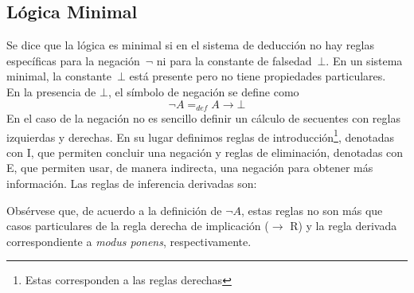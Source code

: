 \documentclass[11pt,letterpaper]{article}
\begin{document}


\subsection{Lógica Minimal}

Se dice que la lógica es minimal si en el sistema de deducci\'on no hay 
reglas específicas para la negación~$\neg$ ni para la constante de falsedad~$\bot$. 
En un sistema minimal, la constante~$\bot$ está presente pero no tiene 
propiedades particulares. \\

En la presencia de $\bot$, el símbolo de negación se define como 
$$ \neg A =_{def} A\to\bot $$
En el caso de la negación no es sencillo definir un cálculo de secuentes con
reglas izquierdas y derechas. En su lugar definimos reglas de
introducción\footnote{Estas corresponden a las reglas 
derechas}, denotadas con {\sc I}, que permiten concluir una negación y reglas 
de eliminación, denotadas con {\sc E}, que permiten usar, de
manera indirecta, una negación para obtener más información. 
Las reglas de inferencia derivadas son:

\begin{mathpar}

\end{mathpar}
Obsérvese que, de acuerdo a la definición de $\neg A$,  estas reglas
no son más que casos particulares de la regla derecha de implicación
\textsc{($\to$ R)} y la regla derivada correspondiente a 
\textit{modus ponens}, respectivamente.
\end{document}
